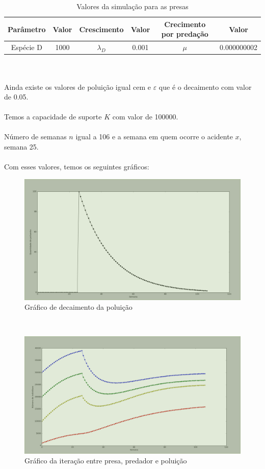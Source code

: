\documentclass[a4paper]{article}
\begin{document}
\\
\\
\begin{table}[ht!]
\centering
\caption{Valores da simula\c{c}\~ao para as presas}
\begin{tabular}{|c|c|c|c|c|c|}
Par\^ametro & Valor & Crescimento & Valor & Crecimento por preda\c{c}\~ao & Valor\\
\hline
Esp\'ecie D & 1000   & $\lambda_D$ & 0.001 & $\mu$ & 0.000000002 
\end{tabular}
\end{table}
\\
\\
Ainda existe os valores de polui\c{c}\~ao igual cem e $\varepsilon$  que \'e o decaimento com valor de 0.05.
\\
\\
Temos a capacidade de suporte $K$ com valor de 100000.
\\
\\
N\'umero de semanas $n$ igual a 106 e a semana em quem ocorre o acidente $x$, semana 25.
\\
\\
Com esses valores, temos os seguintes gr\'aficos:
\\
\begin{figure}[!htb]
\centering
\caption{Gr\'afico de decaimento da polui\c{c}\~ao}
\includegraphics[scale=0.25]{graf_poluicao.png}
\end{figure}
\\
\begin{figure}[!htb]
\centering
\caption{Gr\'afico da itera\c{c}\~ao entre presa, predador e polui\c{c}\~ao}
\includegraphics[scale=0.25]{graf_iteracao.png}
\end{figure}
\end{document}
